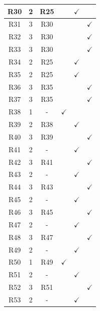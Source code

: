 \documentclass[12pt,a4paper,oneside]{article}
\begin{document}
\begin{longtable}[c]{|c|c|c|c|c|c|}
    \hline
    R30 & 2 & R25 & & $\checkmark$ & \\
    \hline
    R31 & 3 & R30 & & & $\checkmark$ \\
    \hline
    R32 & 3 & R30 & & & $\checkmark$ \\
    \hline
    R33 & 3 & R30 & & & $\checkmark$ \\
    \hline
    R34 & 2 & R25 & & $\checkmark$ & \\
    \hline
    R35 & 2 & R25 & & $\checkmark$ & \\
    \hline
    R36 & 3 & R35 & & & $\checkmark$ \\
    \hline
    R37 & 3 & R35 & & & $\checkmark$ \\
    \hline
    R38 & 1 & - & $\checkmark$ & & \\
    \hline
    R39 & 2 & R38 & & $\checkmark$ & \\
    \hline
    R40 & 3 & R39 & & & $\checkmark$ \\
    \hline
    R41 & 2 & - & & $\checkmark$ & \\
    \hline
    R42 & 3 & R41 & & & $\checkmark$ \\
    \hline
    R43 & 2 & - & & $\checkmark$ & \\
    \hline
    R44 & 3 & R43 & & & $\checkmark$ \\
    \hline
    R45 & 2 & - & & $\checkmark$ & \\
    \hline
    R46 & 3 & R45 & & & $\checkmark$ \\
    \hline
    R47 & 2 & - & & $\checkmark$ & \\
    \hline
    R48 & 3 & R47 & & & $\checkmark$ \\
    \hline
    R49 & 2 & - & & $\checkmark$ & \\
    \hline
    R50 & 1 & R49 & $\checkmark$ & & \\
    \hline
    R51 & 2 & - & & $\checkmark$ & \\
    \hline
    R52 & 3 & R51 & & & $\checkmark$ \\
    \hline
    R53 & 2 & - & & $\checkmark$ & \\
\end{longtable}


\end{document}
